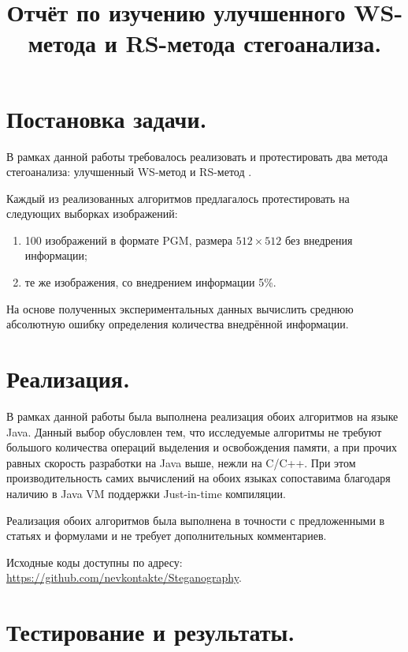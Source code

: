 \documentclass[12pt,a4paper,russian,numbers=endperiod]{scrartcl}
\title{Отчёт по изучению улучшенного WS-метода и RS-метода стегоанализа.}
\begin{document}
\maketitle



\section{Постановка задачи.}

В рамках данной работы требовалось реализовать и протестировать два метода стегоанализа: улучшенный WS-метод \cite{ker} и RS-метод \cite{fridrich}.

Каждый из реализованных алгоритмов предлагалось протестировать на следующих выборках изображений:

\begin{enumerate}
	\item 100 изображений в формате PGM, размера $512\times{}512$ без внедрения информации;
	\item те же изображения, со внедрением информации 5\%.
\end{enumerate}

На основе полученных экспериментальных данных вычислить среднюю абсолютную ошибку определения количества внедрённой информации.

\section{Реализация.}

В рамках данной работы была выполнена реализация обоих алгоритмов на языке Java. Данный  выбор обусловлен тем, что исследуемые алгоритмы не требуют большого количества операций выделения и освобождения памяти, а при прочих равных скорость разработки на Java выше, нежли на C/C++. При этом производительность самих вычислений на обоих языках сопоставима благодаря наличию в Java VM поддержки Just-in-time компиляции.

Реализация обоих алгоритмов была выполнена в точности с предложенными в статьях \cite{ker} и \cite{fridrich} формулами и не требует дополнительных комментариев.

Исходные коды доступны по адресу: \url{https://github.com/nevkontakte/Steganography}.

\section{Тестирование и результаты.}
\end{document}

